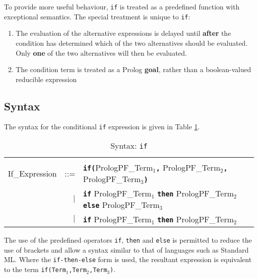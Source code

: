 To provide more useful behaviour, \texttt{if} is treated as a predefined
function with exceptional semantics.  The special treatment is unique
to \texttt{if}:
\begin{enumerate}
\item{The evaluation of the alternative expressions is delayed until
      \textbf{after} the condition has determined which of the
      two alternatives should be evaluated.  Only \textbf{one} of the
      two alternatives will then be evaluated.}
\item{The condition term is treated as a Prolog \textbf{goal}, rather
      than a boolean-valued reducible expression}
\end{enumerate}

\subsection{Syntax}
\enlargethispage{-\baselineskip} %

The syntax for the conditional \texttt{if} expression is given in
Table \ref{syntax:if}.

\begin{table}
{\small
\begin{tabular}{| l r l |}
\hline
 & & \\
If\_{}Expression & ::= & \texttt{\textbf{if(}}PrologPF\_{}Term$_1$\texttt{\textbf{,}}
                                              PrologPF\_{}Term$_2$\texttt{\textbf{,}}
                                              PrologPF\_{}Term$_3$\texttt{\textbf{)}}\\
 & $|$ &  \texttt{\textbf{if}} PrologPF\_{}Term$_1$ \texttt{\textbf{then}}
                               PrologPF\_{}Term$_2$ \texttt{\textbf{else}}
                               PrologPF\_{}Term$_3$\\
 & $|$ &  \texttt{\textbf{if}} PrologPF\_{}Term$_1$ \texttt{\textbf{then}}
                               PrologPF\_{}Term$_2$\\[4mm]
\hline
\end{tabular}
}
\caption{Syntax: \texttt{if}}
\label{syntax:if}
\end{table}

The use of the predefined operators \texttt{if}, \texttt{then} and \texttt{else}
is permitted to reduce the use of brackets and allow a syntax similar to that
of languages such as Standard ML.  Where the \texttt{if-then-else} form is used,
the resultant expression is equivalent to the term
\texttt{if(Term$_1$,Term$_2$,Term$_3$)}.


